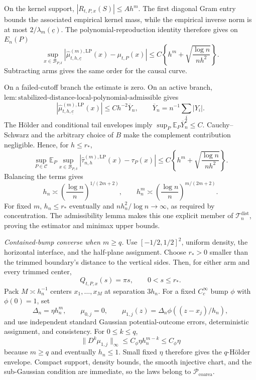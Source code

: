 On the kernel support, \(|R_{t,P,x}(S)|\leq Ah^m\).  The first diagonal Gram entry bounds the associated empirical kernel mass, while the empirical inverse norm is at most \(2/\lambda_m(\underline c)\).  The polynomial-reproduction identity therefore gives on \(E_n(P)\)
\[
\sup_{x\in\mathcal B_{P,\delta}}
|\widehat\mu^{(m),\mathrm{LP}}_{t,h,\underline c}(x)-\mu_{t,P}(x)|
\leq C\left\{h^m+\sqrt{\frac{\log n}{nh^2}}\right\}.
\]
Subtracting arms gives the same order for the causal curve.

On a failed-cutoff branch the estimate is zero.  On an active branch, \(\mathrm{lem:stabilized\text{-}distance\text{-}local\text{-}polynomial\text{-}admissible}\) gives
\[
|\widehat\mu^{(m),\mathrm{LP}}_{t,h,\underline c}(x)|
\leq Ch^{-2}\overline Y_n,
\qquad \overline Y_n=n^{-1}\sum_i|Y_i|.
\]
The H\"older and conditional tail envelopes imply \(\sup_P\mathbb E_P\overline Y_n^2\leq C\).  Cauchy--Schwarz and the arbitrary choice of \(B\) make the complement contribution negligible.  Hence, for \(h\leq r_*\),
\[
\sup_{P\in\mathcal C}\mathbb E_P\sup_{x\in\mathcal B_{P,\delta}}
|\widehat\tau^{(m),\mathrm{LP}}_{n,h}(x)-\tau_P(x)|
\leq C\left\{h^m+\sqrt{\frac{\log n}{nh^2}}\right\}.
\]
Balancing the terms gives
\[
h_n\asymp\left(\frac{\log n}{n}\right)^{1/(2m+2)},
\qquad
h_n^m\asymp\left(\frac{\log n}{n}\right)^{m/(2m+2)}.
\]
For fixed \(m\), \(h_n\leq r_*\) eventually and \(nh_n^2/\log n\to\infty\), as required by concentration.  The admissibility lemma makes this one explicit member of \(\mathcal T_n^{\mathrm{dist}}\), proving the estimator and minimax upper bounds.

\emph{Contained-bump converse when \(m\geq q\).}
Use \([-1/2,1/2]^2\), uniform density, the horizontal interface, and the half-plane assignment.  Choose \(r_*>0\) smaller than the trimmed boundary's distance to the vertical sides.  Then, for either arm and every trimmed center,
\[
Q_{t,P,x}(s)=\pi s,
\qquad 0<s\leq r_*.
\]
Pack \(M\asymp h_n^{-1}\) centers \(x_1,\ldots,x_M\) at separation \(3h_n\).  For a fixed \(C_c^\infty\) bump \(\phi\) with \(\phi(0)=1\), set
\[
\Delta_n=\eta h_n^m,
\qquad
\mu_{0,j}=0,
\qquad
\mu_{1,j}(z)=\Delta_n\phi((z-x_j)/h_n),
\]
and use independent standard Gaussian potential-outcome errors, deterministic assignment, and consistency.  For \(0\leq k\leq q\),
\[
\lVert D^k\mu_{1,j}\rVert_\infty\leq C_\phi\eta h_n^{m-k}\leq C_\phi\eta
\]
because \(m\geq q\) and eventually \(h_n\leq1\).  Small fixed \(\eta\) therefore gives the \(q\)-H\"older envelope.  Compact support, density bounds, the smooth injective chart, and the sub-Gaussian condition are immediate, so the laws belong to \(\mathcal P_{\mathrm{coarea}}\).

